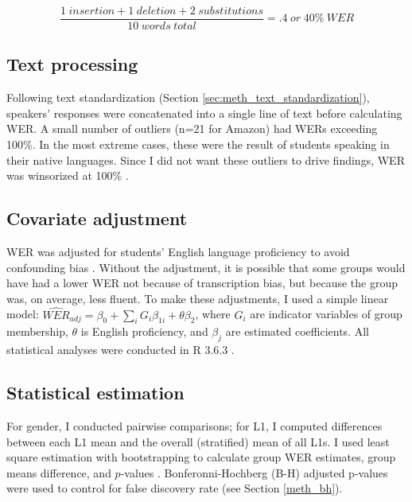 \documentclass [PhD] {uclathes}
\begin{document}
$$
\frac{1 \hspace{3pt} insertion + 1 \hspace{3pt} deletion + 2 \hspace{3pt} substitutions}{10 \hspace{3pt} words \hspace{3pt} total} = .4 \hspace{3pt} or \hspace{3pt} 40\% \hspace{3pt} WER
$$

\subsection{Text processing}

Following text standardization (Section \ref{sec:meth_text_standardization}), speakers’ responses were concatenated into a single line of text before calculating WER. A small number of outliers (n=21 for Amazon) had WERs exceeding 100\%. In the most extreme cases, these were the result of students speaking in their native languages. Since I did not want these outliers to drive findings, WER was winsorized at 100\% \citep{wilcox2012}.

\subsection{Covariate adjustment}
\label{sec:meth_cov}

WER was adjusted for students’ English language proficiency to avoid confounding bias \citep{elwert2014}. Without the adjustment, it is possible that some groups would have had a lower WER not because of transcription bias, but because the group was, on average, less fluent. To make these adjustments, I used a simple linear model: ${\widehat{WER}}_{adj} = \beta_0 + {\textstyle\sum}_{i}G_i\beta_{1i} + \theta\beta_2$, where $G_i$ are indicator variables of group membership, $\theta$ is English proficiency, and $\beta_j$ are estimated coefficients. All statistical analyses were conducted in R 3.6.3 \citep{r2020}.

\subsection{Statistical estimation}

For gender, I conducted pairwise comparisons; for L1, I computed differences between each L1 mean and the overall (stratified) mean of all L1s. I used least square estimation with bootstrapping to calculate group WER estimates, group means difference, and $p$-values \citep{tibshirani1993}. Bonferonni-Hochberg (B-H) adjusted p-values were used to control for false discovery rate (see Section \ref{meth_bh}).
\end{document}
